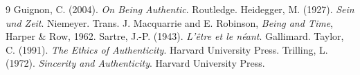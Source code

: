 \documentclass{situationist-preprint}
\begin{document}
\begin{thebibliography}{9}\small
{} Guignon, C. (2004). \emph{On Being Authentic}. Routledge.
 Heidegger, M. (1927). \emph{Sein und Zeit}. Niemeyer. Trans. J. Macquarrie and E. Robinson, \emph{Being and Time}, Harper \& Row, 1962.
 Sartre, J.-P. (1943). \emph{L'\^etre et le n\'eant}. Gallimard.
 Taylor, C. (1991). \emph{The Ethics of Authenticity}. Harvard University Press.
 Trilling, L. (1972). \emph{Sincerity and Authenticity}. Harvard University Press.
\end{thebibliography}
\end{document}
